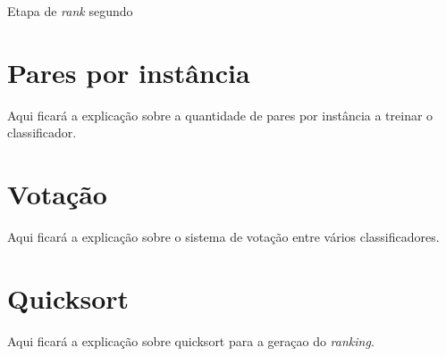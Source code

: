 \begin{algorithm}
\begin{algorithmic}
    


\caption{Etapa de \emph{rank} segundo \cite{langford}}
\label{alg_original_train}

\end{algorithmic}    
\end{algorithm}

\section{Pares por instância}
Aqui ficará a explicação sobre a quantidade de pares por instância a treinar o classificador.

\section{Votação}
Aqui ficará a explicação sobre o sistema de votação entre vários classificadores.

\section{Quicksort}
Aqui ficará a explicação sobre quicksort para a geraçao do \emph{ranking}.
